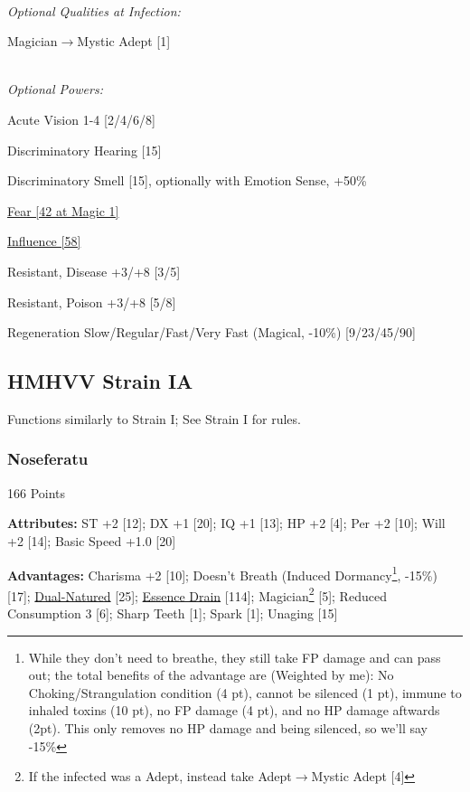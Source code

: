 \begin{multicols*}{3}
	\textit{\\Optional Qualities at Infection:}
	
	Magician$\rightarrow$Mystic Adept [1]
		
	\textit{\\Optional Powers:}
	
	Acute Vision 1-4 [2/4/6/8]
	
	Discriminatory Hearing [15]
	
	Discriminatory Smell [15], optionally with Emotion Sense, +50\%
	
	\hyperref[fear]{Fear [42 at Magic 1]}
	
	\hyperref[influence]{Influence [58]}
		
	Resistant, Disease +3/+8 [3/5]
		
	Resistant, Poison +3/+8 [5/8]
	
	Regeneration Slow/Regular/Fast/Very Fast (Magical, -10\%) [9/23/45/90]
	
	\subsection*{HMHVV Strain IA}
	
	Functions similarly to Strain I; See Strain I for rules.
	
	\subsubsection{Noseferatu}\label{nosferatu}
	\begin{flushright}
		166 Points
	\end{flushright}
	
	\textbf{Attributes:}
	ST +2 [12]; DX +1 [20]; IQ +1 [13]; HP +2 [4]; Per +2 [10]; Will +2 [14]; Basic Speed +1.0 [20]
	
	\textbf{Advantages:}
	Charisma +2 [10]; Doesn't Breath (Induced Dormancy\footnote{While they don't need to breathe, they still take FP damage and can pass out; the total benefits of the advantage are (Weighted by me): No Choking/Strangulation condition (4 pt), cannot be silenced (1 pt), immune to inhaled toxins (10 pt), no FP damage (4 pt), and no HP damage aftwards (2pt). This only removes no HP damage and being silenced, so we'll say -15\%}, -15\%) [17]; \hyperref[dual_natured]{Dual-Natured} [25];  \hyperref[essence_drain]{Essence Drain} [114]; Magician\footnote{If the infected was a Adept, instead take Adept$\rightarrow$Mystic Adept [4]} [5]; Reduced Consumption 3 [6]; Sharp Teeth [1]; Spark [1]; Unaging [15]
	

\end{multicols*}
